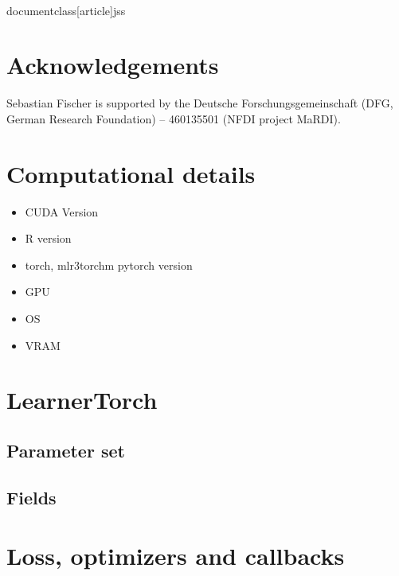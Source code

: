 \\documentclass[article]{jss}
\theoremstyle{definition}
\begin{document}
\section*{Acknowledgements}

Sebastian Fischer is supported by the Deutsche Forschungsgemeinschaft (DFG, German Research Foundation) – 460135501 (NFDI project MaRDI).



\begin{appendix}

\section{Computational details}\label{app:comp-details}

\begin{itemize}
    \item CUDA Version
    \item R version
    \item torch, mlr3torchm pytorch version
    \item GPU
    \item OS
    \item VRAM
\end{itemize}

\section{LearnerTorch}

\subsection{Parameter set}\label{app:learner_ps}
\subsection{Fields}\label{app:learner_fields}

\section{Loss, optimizers and callbacks}\label{app:loss_opts_cbs}

\end{appendix}
\end{document}
